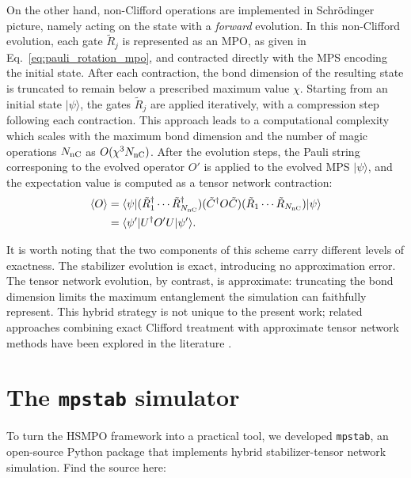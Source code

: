 \documentclass[pra,aps,twocolumn,longbibliography,preprintnumbers,superscriptaddress,nofootnotebib,10pt]{revtex4-2}
\newcommand{\nummagic}{{N_{\rm nC}}} %
\newcommand{\numrotdecomp}{\nummagic}
\begin{document}
On the other hand, non-Clifford operations are implemented in Schrödinger picture, namely acting on the state with a \textit{forward} evolution. In this non-Clifford evolution, each gate $\tilde{R}_j$ is represented as an MPO, as given in Eq.~\eqref{eq:pauli_rotation_mpo}, and contracted directly with the MPS encoding the initial state. After each contraction, the bond dimension of the resulting state is truncated to remain below a prescribed maximum value $\chi$. Starting from an initial state $|\psi\rangle$, the gates $\tilde{R}_j$ are applied iteratively, with a compression step following each contraction. This approach leads to a  computational complexity which scales with the maximum bond dimension and the number of magic operations $\nummagic$ as $O(\chi^3 \nummagic)$. After the evolution steps, the Pauli string corresponing to the evolved operator $O'$ is applied to the evolved MPS $|\psi\rangle$, and the expectation value is computed as a tensor network contraction:
\begin{equation}
\begin{aligned}
\langle O \rangle 
&= \langle \psi | (\tilde{R}_1^\dagger \cdots \tilde{R}_\numrotdecomp^\dagger)(\tilde{C}^\dagger O \tilde{C})(\tilde{R}_1 \cdots \tilde{R}_\numrotdecomp) |\psi\rangle \\
&= \langle \psi' | U^\dagger O' U |\psi' \rangle.
\end{aligned}
\label{eq:contraction}
\end{equation}

It is worth noting that the two components of this scheme carry different levels of exactness. The stabilizer evolution is exact, introducing no approximation error. The tensor network evolution, by contrast, is approximate: truncating the bond dimension limits the maximum entanglement the simulation can faithfully represent. This hybrid strategy is not unique to the present work; related approaches combining exact Clifford treatment with approximate tensor network methods have been explored in the literature \cite{Begusic2024}.


\section{The \texttt{mpstab} simulator}
\label{sec:mpstab}

To turn the HSMPO framework into a practical tool, we developed \texttt{mpstab}, 
an open-source Python package that implements hybrid stabilizer-tensor network simulation. Find the source here: \\
\end{document}
